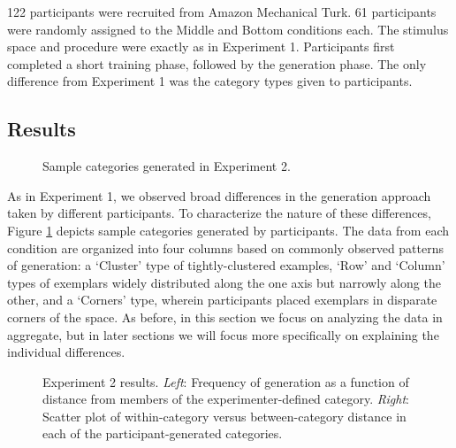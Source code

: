 \documentclass[12pt]{article}
\newcommand\inputpgf[2]{{
\let\pgfimageWithoutPath\pgfimage
\renewcommand{\pgfimage}[2][]{\pgfimageWithoutPath[##1]{#1/##2}}

}}
\begin{document}
\begin{flushleft}
122 participants were recruited from Amazon Mechanical Turk. 61 participants were randomly assigned to the Middle and Bottom conditions each. The stimulus space and procedure were exactly as in Experiment 1. Participants first completed a short training phase, followed by the generation phase. The only difference from Experiment 1 was the category types given to participants.


\subsection{Results}

\begin{figure}
    \begin{center}
    \inputpgf{figs/}{e2-samples.pgf}
    \caption{Sample categories generated in Experiment 2. }
    \label{fig:e2-samples}
    \end{center}
\end{figure}


As in Experiment 1, we observed broad differences in the generation approach taken by different participants.  To characterize the nature of these differences, Figure \ref{fig:e2-samples} depicts sample categories generated by participants. The data from each condition are organized into four columns based on commonly observed patterns of generation: a `Cluster' type of tightly-clustered examples,   `Row' and `Column' types of exemplars widely distributed along the one axis but narrowly along the other, and a `Corners' type, wherein participants placed exemplars in disparate corners of the space. As before, in this section we focus on analyzing the data in aggregate, but in later sections we will focus more specifically on explaining the individual differences.

\begin{figure}
    \begin{center}
    \inputpgf{figs/}{e2-distanceplots.pgf}
    \caption{Experiment 2 results. {\em Left}: Frequency of generation as a function of distance from members of the experimenter-defined category. {\em Right}: Scatter plot of within-category versus between-category distance in each of the participant-generated categories.}
    \label{fig:e2-distanceplots}
    \end{center}
\end{figure}


\end{flushleft}
\end{document}

